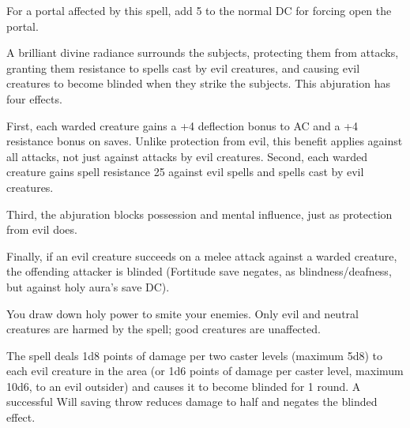 \begin{multicols}{2}
\begin{small}
\smallskip\noindent For a portal affected by this spell, add 5 to the normal DC for forcing open the portal.

\noindent A brilliant divine radiance surrounds the subjects, protecting them from attacks, granting them resistance to spells cast by evil creatures, and causing evil creatures to become blinded when they strike the subjects. This abjuration has four effects.

\smallskip\noindent First, each warded creature gains a +4 deflection bonus to AC and a +4 resistance bonus on saves. Unlike protection from evil, this benefit applies against all attacks, not just against attacks by evil creatures.
Second, each warded creature gains spell resistance 25 against evil spells and spells cast by evil creatures.

\smallskip\noindent Third, the abjuration blocks possession and mental influence, just as protection from evil does.

\smallskip\noindent Finally, if an evil creature succeeds on a melee attack against a warded creature, the offending attacker is blinded (Fortitude save negates, as blindness/deafness, but against holy aura's save DC).


\noindent You draw down holy power to smite your enemies. Only evil and neutral creatures are harmed by the spell; good creatures are unaffected.

\smallskip\noindent The spell deals 1d8 points of damage per two caster levels (maximum 5d8) to each evil creature in the area (or 1d6 points of damage per caster level, maximum 10d6, to an evil outsider) and causes it to become blinded for 1 round. A successful Will saving throw reduces damage to half and negates the blinded effect.


\end{small}
\end{multicols}
